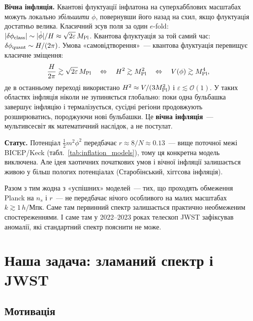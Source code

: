 \documentclass[12pt, a4paper]{article}
\begin{document}
\textbf{Вічна інфляція.} Квантові флуктуації інфлатона на
суперхабблових масштабах можуть локально \emph{збільшити} $\phi$,
повернувши його назад на схил, якщо флуктуація достатньо велика.
Класичний зсув поля за один $e$-fold: $|\delta\phi_{\rm class}|
\sim |\dot\phi|/H \approx \sqrt{2\varepsilon}\,M_{\rm Pl}$.
Квантова флуктуація за той самий час: $\delta\phi_{\rm quant}
\sim H/(2\pi)$. Умова «самовідтворення»~---
квантова флуктуація перевищує класичне зміщення:
\begin{equation*}
  \frac{H}{2\pi} \gtrsim \sqrt{2\varepsilon}\,M_{\rm Pl}
  \quad\Leftrightarrow\quad
  H^2 \gtrsim M_{\rm Pl}^2
  \quad\Leftrightarrow\quad
  V(\phi) \gtrsim M_{\rm Pl}^4,
\end{equation*}
де в останньому переході використано $H^2 \approx V/(3M_{\rm Pl}^2)$
і $\varepsilon \lesssim \mathcal{O}(1)$.
У таких областях інфляція ніколи не зупиняється глобально:
поки одна бульбашка завершує інфляцію і термалізується,
сусідні регіони продовжують розширюватись, породжуючи нові
бульбашки. Це \textbf{вічна інфляція}~--- мультивсесвіт
як математичний наслідок, а не постулат.

\textbf{Статус.} Потенціал $\tfrac{1}{2}m^2\phi^2$ передбачає
$r \approx 8/N \approx 0.13$~--- вище поточної межі BICEP/Keck
(табл.~\ref{tab:inflation_models}), тому ця конкретна модель
виключена. Але ідея хаотичних початкових умов і вічної інфляції
залишається живою у більш пологих потенціалах (Старобінський,
хіггсова інфляція).

Разом з тим жодна з «успішних» моделей~--- тих, що проходять
обмеження Planck на $n_s$ і $r$~--- не передбачає нічого
особливого на малих масштабах $k \gtrsim 1\,h/$Мпк. Саме там
первинний спектр залишається практично необмеженим
спостереженнями. І саме там у 2022--2023 роках телескоп JWST
зафіксував аномалії, які стандартний спектр пояснити не може.


\section{Наша задача: зламаний спектр і JWST}
\label{sec:broken}

\subsection{Мотивація}
\end{document}
